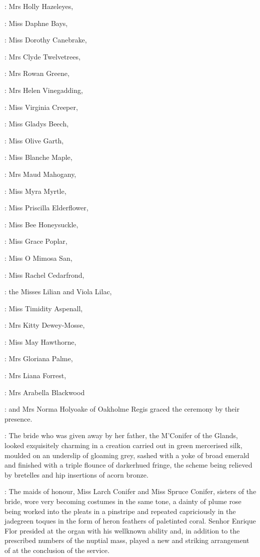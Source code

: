 :
Mrs Holly Hazeleyes, 

:
Miss Daphne Bays, 

:
Miss Dorothy Canebrake, 

:
Mrs Clyde Twelvetrees, 

:
Mrs Rowan Greene, 

:
Mrs Helen Vinegadding, 

:
Miss Virginia Creeper, 

:
Miss Gladys Beech, 

:
Miss Olive Garth, 

:
Miss Blanche Maple, 

:
Mrs Maud Mahogany, 

:
Miss Myra Myrtle, 

:
Miss Priscilla Elderflower, 

:
Miss Bee Honeysuckle, 

:
Miss Grace Poplar, 

:
Miss O Mimosa San, 

:
Miss Rachel Cedarfrond, 

:
the Misses Lilian and Viola Lilac, 

:
Miss Timidity Aspenall, 

:
Mrs Kitty Dewey-Mosse, 

:
Miss May Hawthorne, 

:
Mrs Gloriana Palme, 

:
Mrs Liana Forrest, 

:
Mrs Arabella Blackwood

:
and Mrs Norma Holyoake of Oakholme Regis
graced the ceremony by their presence.

:
The bride who was given away by her father, the M'Conifer of
the Glands,
looked exquisitely charming in a creation carried out in green
mercerised silk, moulded on an underslip of gloaming grey, sashed with a
yoke of broad emerald and finished with a triple flounce of darkerhued
fringe, the scheme being relieved by bretelles and hip insertions of acorn bronze.

:
The maids of honour, Miss Larch Conifer and Miss Spruce Conifer,
sisters of the bride, wore very becoming costumes in the same tone, a
dainty  of plume rose
being worked into the pleats in a pinstripe and
repeated capriciously in the jadegreen toques in the form of heron
feathers of paletinted coral. Senhor Enrique Flor presided at the
organ with his wellknown ability and, in addition to the prescribed
numbers of the nuptial mass, played a new and striking arrangement
of
 at the conclusion of the
service.

